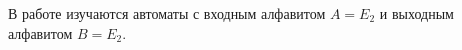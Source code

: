 \documentclass[14pt,a4paper]{extreport}
\begin{document}

%
\renewcommand{\contentsname}{Содержание}
\tableofcontents
\clearpage
\renewcommand{\abstractname}{}
%


В работе изучаются автоматы с входным алфавитом $A=E_2$ и выходным алфавитом $B=E_2$.












\end{document}
